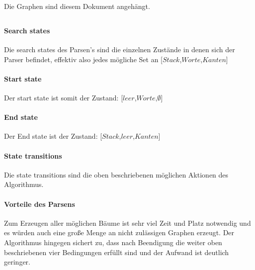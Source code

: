 \documentclass[DIV=calc,numbers=noenddot]{scrartcl}
\begin{document}
			\subsubsection{}
				Die Graphen sind diesem Dokument angehängt.
		\subsection{}
		\subsection{}
			\paragraph{Search states}
				Die search states des Parsen's sind die einzelnen Zustände in denen sich der Parser befindet, effektiv also jedes mögliche Set an [$Stack$,$Worte$,$Kanten$]
			\paragraph{Start state}
				Der start state ist somit der Zustand: [$leer$,$Worte$,$\emptyset$]
			\paragraph{End state}
				Der End state ist der Zustand: [$Stack$,$leer$,$Kanten$]
			\paragraph{State transitions}
				Die state transitions sind die oben beschriebenen möglichen Aktionen des Algorithmus.
			\paragraph{Vorteile des Parsens}
				Zum Erzeugen aller möglichen Bäume ist sehr viel Zeit und Platz notwendig und es würden auch eine große Menge an nicht zulässigen Graphen erzeugt. Der Algorithmus hingegen sichert zu, dass nach Beendigung die weiter oben beschriebenen vier Bedingungen erfüllt sind und der Aufwand ist deutlich geringer.
			
\begin{figure}[h!]
	\centering
	\def\svgwidth{\columnwidth}
	
\end{figure}
\end{document}
